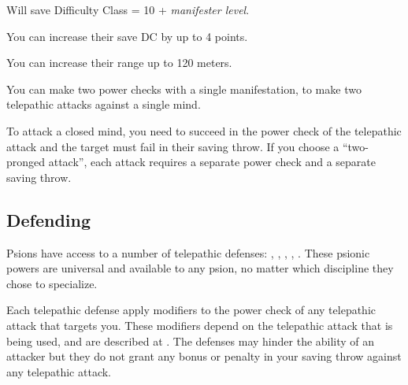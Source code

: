 \begin{itemize*}
	\item Will save Difficulty Class = 10 + \textit{manifester level}.
	\item You can increase their save DC by up to 4 points.
	\item You can increase their range up to 120 meters.
	\item You can make two power checks with a single manifestation, to make two telepathic attacks against a single mind.
\end{itemize*}

To attack a closed mind, you need to succeed in the power check of the telepathic attack and the target must fail in their saving throw. If you choose a ``two-pronged attack'', each attack requires a separate power check and a separate saving throw.

\subsection{Defending}
Psions have access to a number of telepathic defenses: , , , , . These psionic powers are universal and available to any psion, no matter which discipline they chose to specialize.

Each telepathic defense apply modifiers to the power check of any telepathic attack that targets you. These modifiers depend on the telepathic attack that is being used, and are described at . The defenses may hinder the ability of an attacker but they do not grant any bonus or penalty in your saving throw against any telepathic attack.


